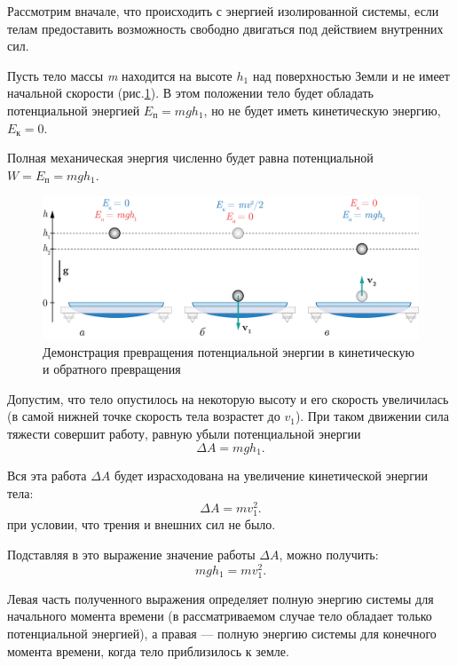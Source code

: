 \documentclass[All.tex]{subfiles}
\begin{document}
Рассмотрим вначале, что происходить с энергией изолированной системы, если телам предоставить возможность свободно двигаться под действием внутренних сил. 

Пусть тело массы \textit{m} находится на высоте $ h_1 $ над поверхностью 
Земли и не имеет начальной скорости (рис.\ref{transform-3}). 
В этом положении тело будет обладать потенциальной энергией $ E_\text{п}=mgh_1 $, но не будет иметь кинетическую энергию, $ E_\text{к}=0 $. 

Полная механическая энергия численно будет равна потенциальной $W = E_\text{п} =mgh_1$.

\begin{figure}[H] 
	\centering 	
	\includegraphics[width=0.9\linewidth]{transform-3.png}
	\caption{Демонстрация превращения потенциальной энергии в кинетическую и обратного превращения}
	\label{transform-3}
\end{figure}

Допустим, что тело опустилось на некоторую высоту и его скорость увеличилась (в самой нижней точке скорость тела возрастет до $ v_1 $).
При таком движении сила тяжести совершит работу, равную убыли потенциальной энергии
\begin{equation}
\Delta A=mgh_1.
\end{equation}

Вся эта работа $ \Delta A  $ будет израсходована на увеличение кинетической энергии тела: 
\begin{equation}
\Delta A=mv_1^2.
\end{equation}
при условии, что трения и внешних сил не было. 

Подставляя в это выражение значение работы $ \Delta A $, можно получить: 
\begin{equation}
mgh_1=mv_1^2.
\end{equation}

Левая часть полученного выражения определяет полную энергию системы для начального момента времени (в рассматриваемом случае тело обладает только потенциальной энергией), 
а правая — полную энергию системы для конечного момента времени, когда тело приблизилось к земле.
\end{document}
